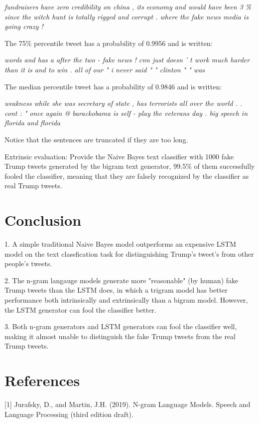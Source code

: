 \documentclass{article}
\begin{document}
\textit{fundraisers have zero credibility on china , its economy and would have been 3 \% since the witch hunt is totally rigged and corrupt . where the fake news media is going crazy !}

The 75\% percentile tweet has a probability of 0.9956 and is written:

\textit{words and has a after the two - fake news ! cnn just doesn ’ t work much harder than it is and to win . all of our " i never said " " clinton " " was}

The median percentile tweet has a probability of 0.9846 and is written:

\textit{weakness while she was secretary of state , has terrorists all over the world . . cont : " once again @ barackobama is self - play the veterans day . big speech in florida and florida}

Notice that the sentences are truncated if they are too long.

Extrinsic evaluation: Provide the Naive Bayes text classifier with 1000 fake Trump tweets generated by the bigram text generator, 99.5\% of them successfully fooled the classifier, meaning that they are falsely recognized by the classifier as real Trump tweets.

\section{Conclusion}
1. A simple traditional Naive Bayes model outperforms an expensive LSTM model on the text classfication task for distinguishing Trump's tweet's from other people's tweets. 

2. The n-gram langauge models generate more "reasonable" (by human) fake Trump tweets than the LSTM does, in which a trigram model has better performance both intrinsically and extrinsically than a bigram model. However, the LSTM generator can fool the classifier better.

3. Both n-gram generators and LSTM generators can fool the classifier well, making it almost unable to distinguish the fake Trump tweets from the real Trump tweets.

\section*{References}
\small

[1] Jurafsky, D., and Martin, J.H. (2019).  N-gram Language Models. Speech and Language Processing (third edition draft). 
\end{document}

